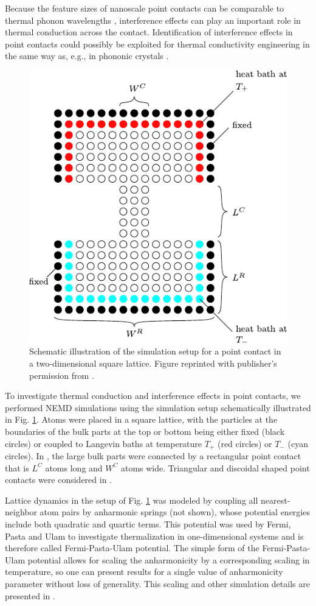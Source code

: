 Because the feature sizes of nanoscale point contacts can be comparable to thermal phonon wavelengths , interference effects can play an important role in thermal conduction across the contact. Identification of interference effects in point contacts could possibly be exploited for thermal conductivity engineering in the same way as, e.g., in phononic crystals \cite{maldovan13}.

\begin{figure}
\begin{center}
 \includegraphics[width=.60\columnwidth]{pics/fpu_fig1_mod.pdf}
 \caption{Schematic illustration of the simulation setup for a point contact in a two-dimensional square lattice. Figure reprinted with publisher's permission from .}
\label{fig:fpu_fig1}
\end{center}
\end{figure}

To investigate thermal conduction and interference effects in point contacts, we performed NEMD simulations using the simulation setup schematically illustrated in Fig. \ref{fig:fpu_fig1}. Atoms were placed in a square lattice, with the particles at the boundaries of the bulk parts at the top or bottom being either fixed (black circles) or coupled to Langevin baths at temperature $T_+$ (red circles) or $T_-$ (cyan circles). In , the large bulk parts were connected by a rectangular point contact that is $L^C$ atoms long and $W^C$ atoms wide. Triangular and discoidal shaped point contacts were considered in . 

Lattice dynamics in the setup of Fig. \ref{fig:fpu_fig1} was modeled by coupling all nearest-neighbor atom pairs by anharmonic springs (not shown), whose potential energies include both quadratic and quartic terms. This potential was used by Fermi, Pasta and Ulam to investigate thermalization in one-dimensional systems \cite{fermi55} and is therefore called Fermi-Pasta-Ulam potential. The simple form of the Fermi-Pasta-Ulam potential allows for scaling the anharmonicity by a corresponding scaling in temperature, so one can present results for a single value of anharmonicity parameter without loss of generality. This scaling and other simulation details are presented in . 



